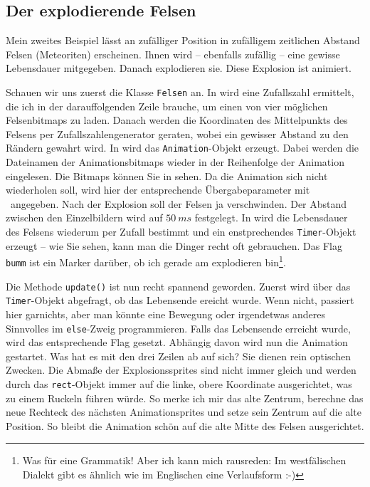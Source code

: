 
\subsection{Der explodierende Felsen}

Mein zweites Beispiel lässt an zufälliger Position in zufälligem zeitlichen Abstand Felsen (Meteoriten) erscheinen. Ihnen wird -- ebenfalls zufällig -- eine gewisse Lebensdauer mitgegeben. Danach explodieren sie. Diese Explosion ist animiert. 

Schauen wir uns zuerst die Klasse \texttt{Felsen} an. In  wird eine Zufallszahl ermittelt, die ich in der darauffolgenden Zeile brauche, um einen von vier möglichen Felsenbitmaps zu laden. Danach werden die Koordinaten des Mittelpunkts des Felsens per Zufallszahlengenerator geraten, wobei ein gewisser Abstand zu den Rändern gewahrt wird. In  wird das \texttt{Animation}-Objekt erzeugt. Dabei werden die Dateinamen der Animationsbitmaps wieder in der Reihenfolge der Animation eingelesen. Die Bitmaps können Sie in  sehen. Da die Animation sich nicht wiederholen soll, wird hier der entsprechende Übergabeparameter mit \false\ angegeben. Nach der Explosion soll der Felsen ja verschwinden. Der Abstand zwischen den Einzelbildern wird auf $50~ms$ festgelegt. In  wird die Lebensdauer des Felsens wiederum per Zufall bestimmt und ein enstprechendes \texttt{Timer}-Objekt erzeugt -- wie Sie sehen, kann man die Dinger recht oft gebrauchen. Das Flag \texttt{bumm} ist ein Marker darüber, ob ich gerade am explodieren bin\footnote{Was für eine Grammatik! Aber ich kann mich rausreden: Im westfälischen Dialekt gibt es ähnlich wie im Englischen eine Verlaufsform :-)}. 

Die Methode \texttt{update()} ist nun recht spannend geworden. Zuerst wird über das \texttt{Timer}-Objekt abgefragt, ob das Lebensende ereicht wurde. Wenn nicht, passiert hier garnichts, aber man könnte eine Bewegung oder irgendetwas anderes Sinnvolles im \texttt{else}-Zweig programmieren. Falls das Lebensende erreicht wurde, wird das entsprechende Flag gesetzt. Abhängig davon wird nun die Animation gestartet. Was hat es mit den drei Zeilen ab  auf sich? Sie dienen rein optischen Zwecken. Die Abmaße der Explosionssprites sind nicht immer gleich und werden durch das \texttt{rect}-Objekt immer auf die linke, obere Koordinate ausgerichtet, was zu einem Ruckeln führen würde. So merke ich mir das alte Zentrum, berechne das neue Rechteck des nächsten Animationsprites und setze sein Zentrum auf die alte Position. So bleibt die Animation schön auf die alte Mitte des Felsen ausgerichtet. 

